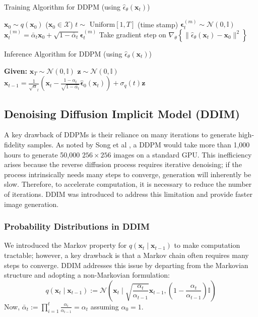 \documentclass{article}
\newcommand{\x}{\mathbf{x}}
\newcommand{\N}{\mathcal{N}}
\begin{document}
	\begin{algorithm}
		\caption{Training Algorithm for DDPM (using $\hat{\epsilon}_\theta (\x_t)$)}
		\begin{algorithmic}[1]
			\Repeat
			\State $\x_0 \sim q(\x_0)$ ($\x_0 \in \mathcal{X}$)
			\State $t \sim \text{ Uniform}[1, T]$ (time stamp)
			\State $\boldsymbol{\epsilon}_t^{(m)} \sim \N (0, \mathbb{I})$
			\State $\x_t^{(m)} = \bar{\alpha}_t \x_0 + \sqrt{1 - \bar{\alpha}_t} \boldsymbol{\epsilon}_t^{(m)}$
			\State Take gradient step on $\nabla_\theta \left\{ \lVert \hat{\epsilon}_\theta (\x_t) - \x_0 \rVert^2 \right\}$
		\end{algorithmic}
	\end{algorithm}
	
	\begin{algorithm}[H]
		\caption{Inference Algorithm for DDPM (using $\hat{\epsilon}_\theta (\x_t)$)}
		\begin{algorithmic}[1]
			\State \textbf{Given:} $\x_T \sim \N (0, \mathbb{I})$
			\For{$t = T, T - 1, \dots, 1$}
			\State $\boldsymbol{z} \sim \N (0, \mathbb{I})$
			\State $\displaystyle \x_{t-1} = \frac{1}{\sqrt{\alpha}_t} \left( \x_t - \frac{1 - \alpha_t}{\sqrt{1 - \bar{\alpha_t}}} \boldsymbol{\hat{\epsilon}}_0 (\x_t) \right) + \sigma_q (t) \boldsymbol{z}$
			\EndFor
		\end{algorithmic}
	\end{algorithm}
	
	\subsection*{Denoising Diffusion Implicit Model (DDIM)}
	
	A key drawback of DDPMs is their reliance on many iterations to generate high-fidelity samples. As noted by Song et al \cite{song2023}, a DDPM would take more than 1,000 hours to generate 50,000 $256 \times 256$ images on a standard GPU. This inefficiency arises because the reverse diffusion process requires iterative denoising; if the process intrinsically needs many steps to converge, generation will inherently be slow. Therefore, to accelerate computation, it is necessary to reduce the number of iterations. DDIM was introduced to address this limitation and provide faster image generation.
	
	\subsubsection*{Probability Distributions in DDIM}
	We introduced the Markov property for $q(\x_t \mid \x_{t-1})$ to make computation tractable; however, a key drawback is that a Markov chain often requires many steps to converge. DDIM addresses this issue by departing from the Markovian structure and adopting a non-Markovian formulation:
	$$q(\x_t \mid \x_{t-1}) := \N \left( \x_t \mid \sqrt{\frac{\alpha_t}{\alpha_{t-1}}} \x_{t-1}, \left( 1 - \frac{\alpha_t}{\alpha_{t-1}} \right) \mathbb{I} \right)$$
	Now, $\displaystyle \bar{\alpha}_t := \prod_{i=1}^t \frac{\alpha_i}{\alpha_{i-1}} = \alpha_t$ assuming $\alpha_0 = 1 $. 
	
\end{document}
